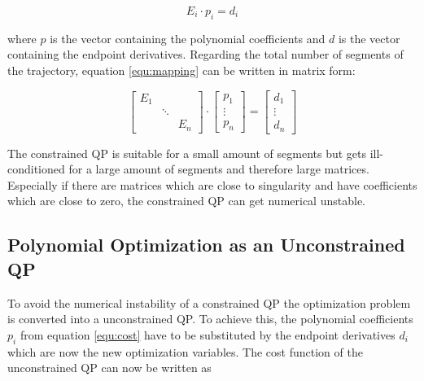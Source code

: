 \begin{equation}
E_i \cdot p_i = d_i
\label{equ:mapping}
\end{equation}

where $p$ is the vector containing the polynomial coefficients and $d$ is the vector containing the endpoint derivatives. Regarding the total number of segments of the trajectory, equation \ref{equ:mapping} can be written in matrix form:

\begin{equation}
\begin{bmatrix}
   E_1 &  &  \\
    & \ddots &  \\
   & & E_n
\end{bmatrix} 
\cdot
\begin{bmatrix}
   p_1 \\
\vdots \\
  p_n
\end{bmatrix}
=
\begin{bmatrix}
   d_1 \\
\vdots \\
  d_n
\end{bmatrix}
\end{equation} 

The constrained QP is suitable for a small amount of segments but gets ill-conditioned for a large amount of segments and therefore large matrices. Especially if there are matrices which are close to singularity and have coefficients which are close to zero, the constrained QP can get numerical unstable.

\subsection{Polynomial Optimization as an Unconstrained QP}\label{sec:polynomialQP}

To avoid the numerical instability of a constrained QP the optimization problem is converted into a unconstrained QP. To achieve this, the polynomial coefficients $p_i$ from equation \ref{equ:cost} have to be substituted by the endpoint derivatives $d_i$ which are now the new optimization variables. The cost function of the unconstrained QP can now be written as 

